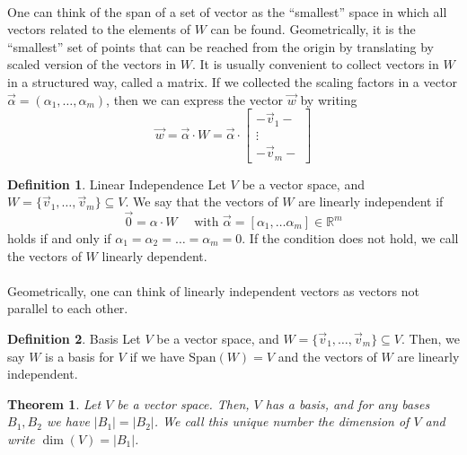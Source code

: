 \documentclass{article}
\newtheorem{theorem}{Theorem}[section]
\theoremstyle{definition}
\newtheorem{definition}{Definition}[section]
\newcommand{\Reals}{\mathbb{R}}
\newcommand{\Span}{\text{Span}}
\begin{document}
\paragraph{} One can think of the span of a set of vector as the ``smallest''
space in which all vectors related to the elements of $W$ can be found.
Geometrically, it is the ``smallest'' set of points that can be reached from the
origin by translating by scaled version of the vectors in $W$. It is usually
convenient to collect vectors in $W$ in a structured way, called a matrix. If we
collected the scaling factors in a vector $\vec{\alpha} = (\alpha_1, \hdots,
\alpha_m)$, then we can express the vector $\vec{w}$ by writing
\[
  \vec{w} = \vec{\alpha} \cdot W = \vec{\alpha} \cdot 
  \begin{bmatrix}
    - \vec{v}_1 - \\
    \vdots \\
    - \vec{v}_m - 
  \end{bmatrix}
\]
\begin{definition}{Linear Independence}
  Let $V$ be a vector space, and $W = \{\vec{v}_1, \hdots, \vec{v}_m\} \subseteq
  V$. We say that the vectors of $W$ are linearly independent if
  \[
    \vec{0} = \alpha \cdot W\quad\text{ with }
    \vec{\alpha} = [\alpha_1, \hdots \alpha_m] \in \Reals^m 
 \]
  holds if and only if $\alpha_1 = \alpha_2 = \hdots = \alpha_m = 0$. If the
  condition does not hold, we call the vectors of $W$ linearly dependent.
\end{definition}
\paragraph{} Geometrically, one can think of linearly independent vectors as
vectors not parallel to each other.
\begin{definition}{Basis}
  Let $V$ be a vector space, and $W = \{\vec{v}_1, \hdots, \vec{v}_m\} \subseteq
  V$. Then, we say $W$ is a basis for $V$ if we have $\Span(W) = V$ and the
  vectors of $W$ are linearly independent.
\end{definition}
\begin{theorem}
  Let $V$ be a vector space. Then, $V$ has a basis, and for any bases $B_1, B_2$
  we have $|B_1| = |B_2|$. We call this unique number the dimension of $V$ and
  write $\dim(V) = |B_1|$.
\end{theorem}
\end{document}
